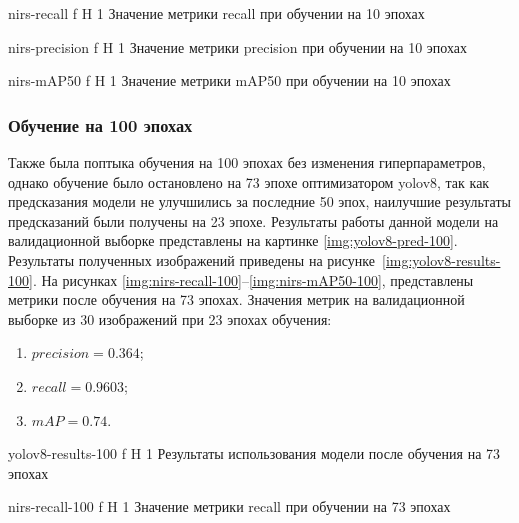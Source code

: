 {nirs-recall} %
{f} %
{H} %
{1\textwidth} %
{Значение метрики recall при обучении на 10 эпохах} %


{nirs-precision} %
{f} %
{H} %
{1\textwidth} %
{Значение метрики precision при обучении на 10 эпохах} %


{nirs-mAP50} %
{f} %
{H} %
{1\textwidth} %
{Значение метрики mAP50 при обучении на 10 эпохах} %

\subsubsection{Обучение на 100 эпохах}
\label{res:learn-100}
Также была поптыка обучения на 100 эпохах без изменения гиперпараметров, однако обучение было остановлено на 73 эпохе оптимизатором yolov8, так как предсказания модели не улучшились
за последние 50 эпох, наилучшие результаты предсказаний были получены на 23 эпохе. Результаты работы данной модели на валидационной выборке представлены на картинке \ref{img:yolov8-pred-100}.
Результаты полученных изображений приведены на рисунке~\ref{img:yolov8-results-100}.
На рисунках \ref{img:nirs-recall-100}--\ref{img:nirs-mAP50-100}, представлены метрики после обучения на 73 эпохах.
Значения метрик  на валидационной выборке из 30 изображений при 23 эпохах обучения:
\begin{enumerate}
	\item $precision=0.364$;
	\item $recall=0.9603$;
	\item $mAP=0.74$.
\end{enumerate}


{yolov8-results-100} %
{f} %
{H} %
{1\textwidth} %
{Результаты использования модели после обучения на 73 эпохах} %

{nirs-recall-100} %
{f} %
{H} %
{1\textwidth} %
{Значение метрики recall при обучении на 73 эпохах} %


